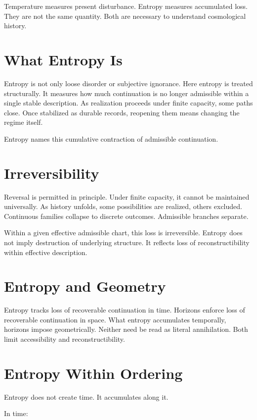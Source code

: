 \documentclass[11pt,twoside,openright]{book}
\begin{document}
Temperature measures present disturbance. Entropy measures accumulated loss. They are not the same quantity. Both are necessary to understand cosmological history.

\section*{What Entropy Is}

Entropy is not only loose disorder or subjective ignorance. Here entropy is treated structurally. It measures how much continuation is no longer admissible within a single stable description. As realization proceeds under finite capacity, some paths close. Once stabilized as durable records, reopening them means changing the regime itself.

Entropy names this cumulative contraction of admissible continuation.

\section*{Irreversibility}

Reversal is permitted in principle. Under finite capacity, it cannot be maintained universally. As history unfolds, some possibilities are realized, others excluded. Continuous families collapse to discrete outcomes. Admissible branches separate.

Within a given effective admissible chart, this loss is irreversible. Entropy does not imply destruction of underlying structure. It reflects loss of reconstructibility within effective description.

\section*{Entropy and Geometry}

Entropy tracks loss of recoverable continuation in time. Horizons enforce loss of recoverable continuation in space. What entropy accumulates temporally, horizons impose geometrically. Neither need be read as literal annihilation. Both limit accessibility and reconstructibility.

\section*{Entropy Within Ordering}

Entropy does not create time. It accumulates along it.

In time:
\end{document}
